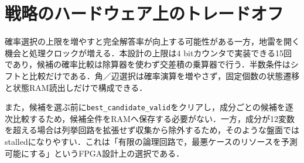 \section{戦略のハードウェア上のトレードオフ}
\label{sec:stall-tradeoff}

確率選択の上限を増やすと完全解答率が向上する可能性がある一方，地雷を開く機会と処理クロックが増える．本設計の上限は4 bitカウンタで実装できる15回であり，候補の確率比較は除算器を使わず交差積の乗算器で行う．半数条件はシフトと比較だけである．角／辺選択は確率演算を増やさず，固定個数の状態遷移と状態RAM読出しだけで構成できる．

また，候補を選ぶ前に\texttt{best\_candidate\_valid}をクリアし，成分ごとの候補を逐次比較するため，候補全件をRAMへ保存する必要がない．一方，成分が12変数を超える場合は列挙回路を拡張せず収集から除外するため，そのような盤面ではstalledになりやすい．これは「有限の論理回路で，最悪ケースのリソースを予測可能にする」というFPGA設計上の選択である．




